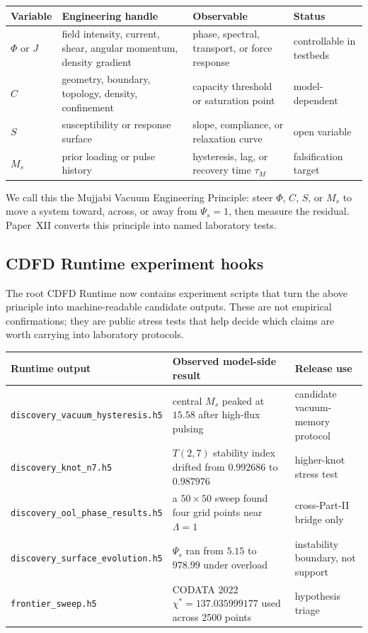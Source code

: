 \documentclass[11pt]{article}
\begin{document}
\begin{center}
\small
\begin{tabular}{p{}p{}p{}p{}}
\toprule
\textbf{Variable} & \textbf{Engineering handle} & \textbf{Observable} & \textbf{Status}\\
\midrule
$\Phi$ or $J$ & field intensity, current, shear, angular momentum, density gradient & phase, spectral, transport, or force response & controllable in testbeds\\
$C$ & geometry, boundary, topology, density, confinement & capacity threshold or saturation point & model-dependent\\
$S$ & susceptibility or response surface & slope, compliance, or relaxation curve & open variable\\
$M_s$ & prior loading or pulse history & hysteresis, lag, or recovery time $\tau_M$ & falsification target\\
\bottomrule
\end{tabular}
\end{center}

We call this the Mujjabi Vacuum Engineering Principle: steer $\Phi$, $C$, $S$,
or $M_s$ to move a system toward, across, or away from $\Psi_s=1$, then measure
the residual. Paper~XII converts this principle into named laboratory tests.

\subsection{CDFD Runtime experiment hooks}

The root CDFD Runtime now contains experiment scripts that turn the above
principle into machine-readable candidate outputs. These are not empirical
confirmations; they are public stress tests that help decide which claims are
worth carrying into laboratory protocols.

\begin{center}
\small
\begin{tabular}{p{}p{}p{}}
\toprule
\textbf{Runtime output} & \textbf{Observed model-side result} & \textbf{Release use}\\
\midrule
\texttt{discovery\_vacuum\_hysteresis.h5} &
central $M_s$ peaked at $15.58$ after high-flux pulsing &
candidate vacuum-memory protocol\\
\texttt{discovery\_knot\_n7.h5} &
$T(2,7)$ stability index drifted from $0.992686$ to $0.987976$ &
higher-knot stress test\\
\texttt{discovery\_ool\_phase\_results.h5} &
a $50\times50$ sweep found four grid points near $\Lambda=1$ &
cross-Part-II bridge only\\
\texttt{discovery\_surface\_evolution.h5} &
$\Psi_s$ ran from $5.15$ to $978.99$ under overload &
instability boundary, not support\\
\texttt{frontier\_sweep.h5} &
CODATA 2022 $\chi^*=137.035999177$ used across 2500 points &
hypothesis triage\\
\bottomrule
\end{tabular}
\end{center}
\end{document}
